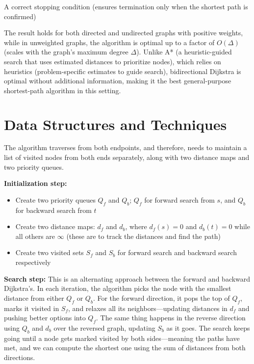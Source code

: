 \documentclass[12pt]{article}
\begin{document}
A correct stopping condition (ensures termination only when the shortest path is confirmed)

The result holds for both directed and undirected graphs with positive weights, while in unweighted graphs, the algorithm is optimal up to a factor of \( O(\Delta) \) (scales with the graph's maximum degree \( \Delta \)). Unlike A* (a heuristic-guided search that uses estimated distances to prioritize nodes), which relies on heuristics (problem-specific estimates to guide search), bidirectional Dijkstra is optimal without additional information, making it the best general-purpose shortest-path algorithm in this setting.

\section*{Data Structures and Techniques}
The algorithm traverses from both endpoints, and therefore, needs to maintain a list of visited nodes from both ends separately, along with two distance maps and two priority queues. 

\textbf{Initialization step:}
\begin{itemize}
  \item Create two priority queues \( Q_f \) and \( Q_b \); \( Q_f \) for forward search from \( s \), and \( Q_b \) for backward search from \( t \)
  \item Create two distance maps: \( d_f \) and \( d_b \), where \( d_f(s)=0 \) and \( d_b(t)=0 \) while all others are \( \infty \) (these are to track the distances and find the path)
  \item Create two visited sets \( S_f \) and \( S_b \) for forward search and backward search respectively
\end{itemize}

\textbf{Search step:}
This is an alternating approach between the forward and backward Dijkstra's. In each iteration, the algorithm picks the node with the smallest distance from either \( Q_f \) or \( Q_b \). For the forward direction, it pops the top of \( Q_f \), marks it visited in \( S_f \), and relaxes all its neighbors—updating distances in \( d_f \) and pushing better options into \( Q_f \). The same thing happens in the reverse direction using \( Q_b \) and \( d_b \) over the reversed graph, updating \( S_b \) as it goes. The search keeps going until a node gets marked visited by both sides—meaning the paths have met, and we can compute the shortest one using the sum of distances from both directions.
\end{document}
